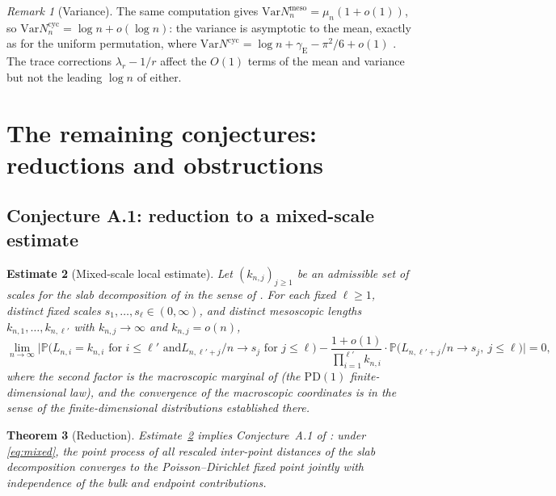 \documentclass[11pt]{article}
\newcommand{\Prob}{\mathbb{P}}
\newcommand{\1}{\mathbf{1}}
\newcommand{\Var}{\mathrm{Var}}
\newcommand{\cyc}{\mathrm{cyc}}
\newcommand{\PD}{\mathrm{PD}}
\newcommand{\gE}{\gamma_{\mathrm{E}}}
\newtheorem{theorem}{Theorem}[section]
\newtheorem{estimate}[theorem]{Estimate}
\theoremstyle{remark}
\newtheorem{remark}[theorem]{Remark}
\begin{document}
\begin{remark}[Variance]\label{rem:variance}
The same computation gives
$\Var N_n^{\mathrm{meso}}=\mu_n(1+o(1))$, so
$\Var N_n^{\cyc}=\log n+o(\log n)$: the variance is asymptotic to the mean,
exactly as for the uniform permutation, where
$\Var N^{\cyc}=\log n+\gE-\pi^2/6+o(1)$ \cite{ABT92}. The trace
corrections $\lambda_r-1/r$ affect the $O(1)$ terms of the mean and
variance but not the leading $\log n$ of either.
\end{remark}
\section{The remaining conjectures: reductions and
obstructions}\label{sec:remaining}

\subsection{Conjecture A.1: reduction to a mixed-scale
estimate}\label{sec:A1}

\begin{estimate}[Mixed-scale local estimate]\label{est:mixed}
Let $(k_{n,j})_{j\ge1}$ be an admissible set of scales for the slab
decomposition of \cite[Section~6]{Lon26} in the sense of
\cite[Definition~8.1]{Lon26}. For each fixed $\ell\ge1$, distinct fixed
scales $s_1,\dots,s_\ell\in(0,\infty)$, and distinct mesoscopic lengths
$k_{n,1},\dots,k_{n,\ell'}$ with $k_{n,j}\to\infty$ and
$k_{n,j}=o(n)$,
\begin{equation}\label{eq:mixed}
\lim_{n\to\infty}\Big|
\Prob\big(\text{$L_{n,i}=k_{n,i}$ for $i\le\ell'$ and
$L_{n,\ell'+j}/n\to s_j$ for $j\le\ell$}\big)
-\frac{1+o(1)}{\prod_{i=1}^{\ell'}k_{n,i}}\cdot
\Prob\big(L_{n,\ell'+j}/n\to s_j,\ j\le\ell\big)\Big|=0,
\end{equation}
where the second factor is the macroscopic marginal of
\cite[Theorem~6.1]{Lon26} (the $\PD(1)$ finite-dimensional law), and
the convergence of the macroscopic coordinates is in the sense of the
finite-dimensional distributions established there.
\end{estimate}

\begin{theorem}[Reduction]\label{thm:A1-reduction}
Estimate~\ref{est:mixed} implies Conjecture~A.1 of \cite[Appendix~A]{Lon26}:
under \eqref{eq:mixed}, the point process of all rescaled inter-point
distances of the slab decomposition converges to the Poisson--Dirichlet
fixed point \cite[Theorem~10.1]{Lon26} jointly with independence of the
bulk and endpoint contributions.
\end{theorem}
\end{document}
